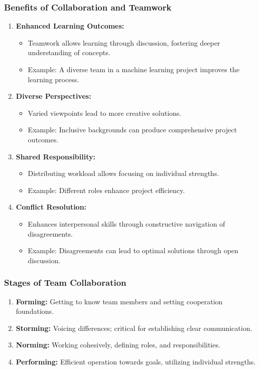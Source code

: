 \documentclass[aspectratio=169]{beamer}
\begin{document}
\begin{frame}[fragile]
    \frametitle{Benefits of Collaboration and Teamwork}
    \begin{enumerate}
        \item \textbf{Enhanced Learning Outcomes:}
        \begin{itemize}
            \item Teamwork allows learning through discussion, fostering deeper understanding of concepts.
            \item Example: A diverse team in a machine learning project improves the learning process.
        \end{itemize}

        \item \textbf{Diverse Perspectives:}
        \begin{itemize}
            \item Varied viewpoints lead to more creative solutions.
            \item Example: Inclusive backgrounds can produce comprehensive project outcomes.
        \end{itemize}

        \item \textbf{Shared Responsibility:}
        \begin{itemize}
            \item Distributing workload allows focusing on individual strengths.
            \item Example: Different roles enhance project efficiency.
        \end{itemize}
        
        \item \textbf{Conflict Resolution:}
        \begin{itemize}
            \item Enhances interpersonal skills through constructive navigation of disagreements.
            \item Example: Disagreements can lead to optimal solutions through open discussion.
        \end{itemize}
    \end{enumerate}
\end{frame}

\begin{frame}[fragile]
    \frametitle{Stages of Team Collaboration}
    \begin{enumerate}
        \item \textbf{Forming:} Getting to know team members and setting cooperation foundations.
        \item \textbf{Storming:} Voicing differences; critical for establishing clear communication.
        \item \textbf{Norming:} Working cohesively, defining roles, and responsibilities.
        \item \textbf{Performing:} Efficient operation towards goals, utilizing individual strengths.
    \end{enumerate}
\end{frame}
\end{document}
